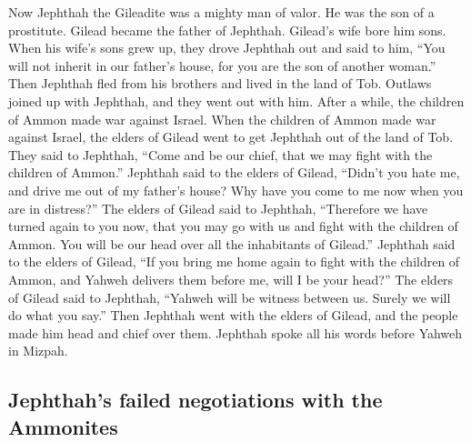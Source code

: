  Now Jephthah the Gileadite was a mighty man of valor. He
was the son of a prostitute. Gilead became the father of Jephthah.
 Gilead's wife bore him sons. When his wife's sons grew
up, they drove Jephthah out and said to him, ``You will not inherit in
our father's house, for you are the son of another woman.''
 Then Jephthah fled from his brothers and lived in the
land of Tob. Outlaws joined up with Jephthah, and they went out with
him.  After a while, the children of Ammon made war
against Israel.  When the children of Ammon made war
against Israel, the elders of Gilead went to get Jephthah out of the
land of Tob.  They said to Jephthah, ``Come and be our
chief, that we may fight with the children of Ammon.'' 
Jephthah said to the elders of Gilead, ``Didn't you hate me, and drive
me out of my father's house? Why have you come to me now when you are in
distress?''  The elders of Gilead said to Jephthah,
``Therefore we have turned again to you now, that you may go with us and
fight with the children of Ammon. You will be our head over all the
inhabitants of Gilead.''  Jephthah said to the elders of
Gilead, ``If you bring me home again to fight with the children of
Ammon, and Yahweh delivers them before me, will I be your head?''
 The elders of Gilead said to Jephthah, ``Yahweh will be
witness between us. Surely we will do what you say.'' 
Then Jephthah went with the elders of Gilead, and the people made him
head and chief over them. Jephthah spoke all his words before Yahweh in
Mizpah.

\hypertarget{jephthahs-failed-negotiations-with-the-ammonites}{%
\subsection{Jephthah's failed negotiations with the
Ammonites}\label{jephthahs-failed-negotiations-with-the-ammonites}}


